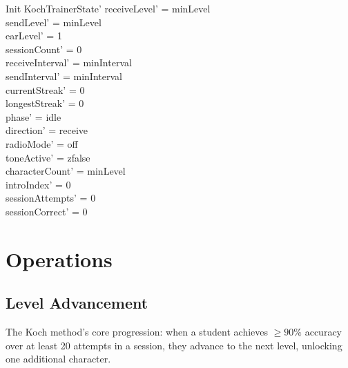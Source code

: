 \documentclass[a4paper,10pt,fleqn]{article}
\begin{document}
\begin{schema}{Init}
KochTrainerState'
\where
receiveLevel' = minLevel \\
sendLevel' = minLevel \\
earLevel' = 1 \\
sessionCount' = 0 \\
receiveInterval' = minInterval \\
sendInterval' = minInterval \\
currentStreak' = 0 \\
longestStreak' = 0 \\
phase' = idle \\
direction' = receive \\
radioMode' = off \\
toneActive' = zfalse \\
characterCount' = minLevel \\
introIndex' = 0 \\
sessionAttempts' = 0 \\
sessionCorrect' = 0
\end{schema}

\section{Operations}

\subsection{Level Advancement}

The Koch method's core progression: when a student achieves $\geq 90\%$ accuracy
over at least 20 attempts in a session, they advance to the next level, unlocking
one additional character.
\end{document}
